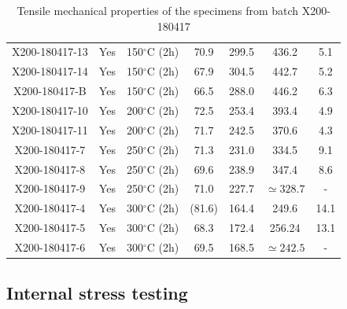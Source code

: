 \begin{center}
\begin{table}[ht]
{\begin{tabular}{|c|c|c |c |c| c|c|}
    X200-180417-13 & Yes & 150$^\circ$C (2h) & 70.9  & 299.5 & 436.2 & 5.1  \\    
    X200-180417-14 & Yes & 150$^\circ$C (2h) & 67.9 & 304.5  &442.7  & 5.2  \\    
    X200-180417-B & Yes & 150$^\circ$C (2h) & 66.5 & 288.0  & 446.2 &6.3  \\    
    X200-180417-10 & Yes & 200$^\circ$C (2h) &72.5  &253.4  & 393.4  &4.9  \\    
    X200-180417-11 & Yes & 200$^\circ$C (2h) &71.7  &242.5  &370.6  &4.3  \\    
    X200-180417-7 & Yes& 250$^\circ$C (2h) & 71.3 & 231.0 & 334.5 & 9.1 \\
    X200-180417-8 & Yes& 250$^\circ$C (2h) & 69.6 & 238.9 & 347.4 & 8.6 \\
    X200-180417-9 & Yes& 250$^\circ$C (2h) & 71.0 & 227.7 &$\simeq 328.7$ & - \\
    X200-180417-4 & Yes& 300$^\circ$C (2h) & (81.6) & 164.4 & 249.6 & 14.1 \\ 
    X200-180417-5 & Yes& 300$^\circ$C (2h) & 68.3 &172.4 & 256.24 & 13.1 \\
    X200-180417-6 & Yes& 300$^\circ$C (2h) & 69.5 &168.5 & $\simeq 242.5$ & - \\

\hline
\end{tabular}}

\caption[Tensile mechanical properties of the specimens from batch X200-180417]{Tensile mechanical properties of the specimens from batch X200-180417}
\label{tab:pol}
\end{table}
 \end{center}
 
\subsection{Internal stress testing}





